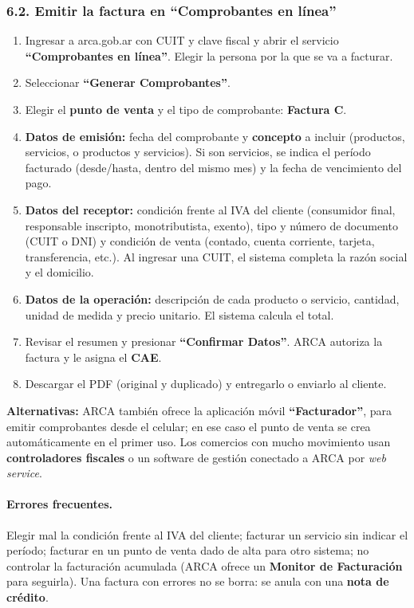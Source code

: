\subsubsection*{6.2. Emitir la factura en ``Comprobantes en línea''}
\begin{enumerate}
  \item Ingresar a arca.gob.ar con CUIT y clave fiscal y abrir el servicio
        \textbf{``Comprobantes en línea''}. Elegir la persona por la que se va a facturar.
  \item Seleccionar \textbf{``Generar Comprobantes''}.
  \item Elegir el \textbf{punto de venta} y el tipo de comprobante: \textbf{Factura C}.
  \item \textbf{Datos de emisión:} fecha del comprobante y \textbf{concepto} a incluir
        (productos, servicios, o productos y servicios). Si son servicios, se indica el
        período facturado (desde/hasta, dentro del mismo mes) y la fecha de vencimiento
        del pago.
  \item \textbf{Datos del receptor:} condición frente al IVA del cliente (consumidor final,
        responsable inscripto, monotributista, exento), tipo y número de documento (CUIT o
        DNI) y condición de venta (contado, cuenta corriente, tarjeta, transferencia, etc.).
        Al ingresar una CUIT, el sistema completa la razón social y el domicilio.
  \item \textbf{Datos de la operación:} descripción de cada producto o servicio, cantidad,
        unidad de medida y precio unitario. El sistema calcula el total.
  \item Revisar el resumen y presionar \textbf{``Confirmar Datos''}. ARCA autoriza la
        factura y le asigna el \textbf{CAE}.
  \item Descargar el PDF (original y duplicado) y entregarlo o enviarlo al cliente.
\end{enumerate}

\begin{recuadro}
\textbf{Alternativas:} ARCA también ofrece la aplicación móvil \textbf{``Facturador''}, para
emitir comprobantes desde el celular; en ese caso el punto de venta se crea
automáticamente en el primer uso. Los comercios con mucho movimiento usan
\textbf{controladores fiscales} o un software de gestión conectado a ARCA por
\textit{web service}.
\end{recuadro}

\paragraph*{Errores frecuentes.}
Elegir mal la condición frente al IVA del cliente; facturar un servicio sin indicar el
período; facturar en un punto de venta dado de alta para otro sistema; no controlar la
facturación acumulada (ARCA ofrece un \textbf{Monitor de Facturación} para seguirla).
Una factura con errores no se borra: se anula con una \textbf{nota de crédito}.

